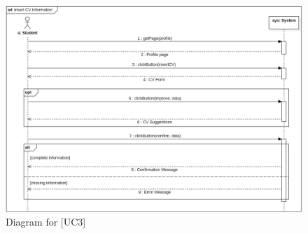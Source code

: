 \begin{figure} [H]
    \centering
    \includegraphics[width=1\linewidth]{Use Cases Images/insert_CV_informations.png}
    \caption{Diagram for [UC3]}
    \label{fig: Insert CV Information Diagram}
\end{figure}

